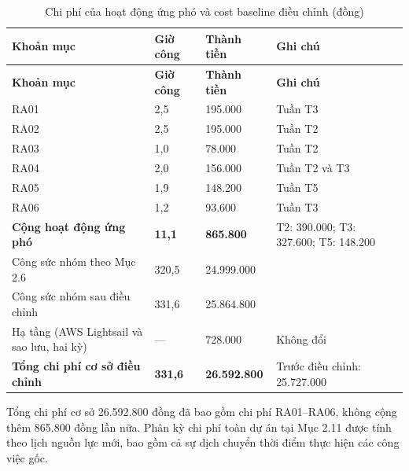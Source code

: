 {\small
\begin{longtable}{@{}Y{5.3cm}Y{2.0cm}Y{3.0cm}Y{3.4cm}@{}}
\caption{Chi phí của hoạt động ứng phó và cost baseline điều chỉnh (đồng)}
\label{tab:p29-cost}\\
\toprule
\textbf{Khoản mục} &
\textbf{Giờ công} &
\textbf{Thành tiền} &
\textbf{Ghi chú} \\
\midrule
\endfirsthead

\toprule
\textbf{Khoản mục} &
\textbf{Giờ công} &
\textbf{Thành tiền} &
\textbf{Ghi chú} \\
\midrule
\endhead

\bottomrule
\endfoot

RA01 & 2,5 & 195.000 & Tuần T3 \\

RA02 & 2,5 & 195.000 & Tuần T2 \\

RA03 & 1,0 & 78.000 & Tuần T2 \\

RA04 & 2,0 & 156.000 & Tuần T2 và T3 \\

RA05 & 1,9 & 148.200 & Tuần T5 \\

RA06 & 1,2 & 93.600 & Tuần T3 \\

\midrule
\textbf{Cộng hoạt động ứng phó} &
\textbf{11,1} &
\textbf{865.800} &
T2: 390.000; T3: 327.600; T5: 148.200 \\

\midrule
Công sức nhóm theo Mục 2.6 &
320,5 &
24.999.000 & \\

Công sức nhóm sau điều chỉnh &
331,6 &
25.864.800 & \\

Hạ tầng (AWS Lightsail và sao lưu, hai kỳ) &
--- &
728.000 &
Không đổi \\

\midrule
\textbf{Tổng chi phí cơ sở điều chỉnh} &
\textbf{331,6} &
\textbf{26.592.800} &
Trước điều chỉnh: 25.727.000 \\

\end{longtable}
}

Tổng chi phí cơ sở 26.592.800 đồng đã bao gồm chi phí RA01--RA06, không cộng thêm 865.800 đồng lần nữa. Phân kỳ chi phí toàn dự án tại Mục 2.11 được tính theo lịch nguồn lực mới, bao gồm cả sự dịch chuyển thời điểm thực hiện các công việc gốc.

